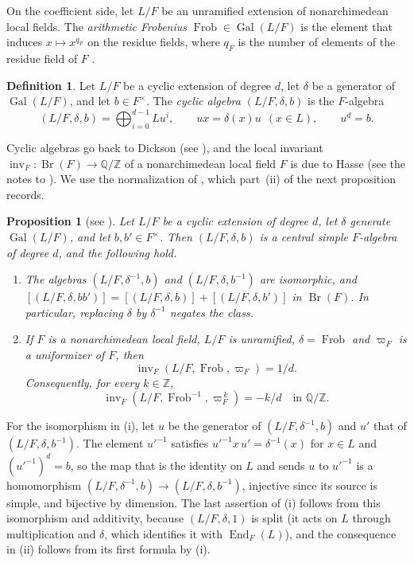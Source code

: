\documentclass[a4paper,11pt]{amsart}
\newtheorem{proposition}[theorem]{Proposition}
\theoremstyle{definition}
\newtheorem{definition}[theorem]{Definition}
\theoremstyle{remark}
\numberwithin{equation}{section}
\newcommand{\Q}{\mathbb{Q}}
\newcommand{\Z}{\mathbb{Z}}
\DeclareMathOperator{\Br}{Br}
\DeclareMathOperator{\inv}{inv}
\DeclareMathOperator{\End}{End}
\DeclareMathOperator{\Gal}{Gal}
\DeclareMathOperator{\Frob}{Frob}
\begin{document}
On the coefficient side, let $L/F$ be an unramified extension of nonarchimedean local fields. The \emph{arithmetic Frobenius} $\Frob\in\Gal(L/F)$ is the element that induces $x\mapsto x^{q_F}$ on the residue fields, where $q_F$ is the number of elements of the residue field of $F$ \cite[I, \S1]{Mil20}.

\begin{definition}\label{def:cyclic}
Let $L/F$ be a cyclic extension of degree $d$, let $\delta$ be a generator of $\Gal(L/F)$, and let $b\in F^\times$. The \emph{cyclic algebra} $(L/F,\delta,b)$ is the $F$-algebra
\[
 (L/F,\delta,b)=\bigoplus_{i=0}^{d-1}Lu^i,\qquad ux=\delta(x)u\ \ (x\in L), \qquad u^d=b.
\]
\end{definition}

Cyclic algebras go back to Dickson (see \cite[VIII, \S2]{Mil20}), and the local invariant $\inv_F\colon\Br(F)\to\Q/\Z$ of a nonarchimedean local field $F$ is due to Hasse (see the notes to \cite[IV, \S4]{Mil20}). We use the normalization of \cite[IV, \S4]{Mil20}, which part~(ii) of the next proposition records.

\begin{proposition}[see {\cite[IV, Theorem~3.14, Lemma~3.15 and Example~4.2]{Mil20}}]
\label{prop:cyclic}
Let $L/F$ be a cyclic extension of degree $d$, let $\delta$ generate $\Gal(L/F)$, and let $b,b'\in F^\times$. Then $(L/F,\delta,b)$ is a central simple $F$-algebra of degree $d$, and the following hold.
\begin{enumerate}
\item[(i)] The algebras $(L/F,\delta^{-1},b)$ and $(L/F,\delta,b^{-1})$ are isomorphic, and $[(L/F,\delta,bb')]=[(L/F,\delta,b)]+[(L/F,\delta,b')]$ in $\Br(F)$. In particular, replacing $\delta$ by $\delta^{-1}$ negates the class.
\item[(ii)] If $F$ is a nonarchimedean local field, $L/F$ is unramified, $\delta=\Frob$ and $\varpi_F$ is a uniformizer of $F$, then
\[
 \inv_F(L/F,\Frob,\varpi_F)=1/d.
\]
Consequently, for every $k\in\Z$,
\[
 \inv_F(L/F,\Frob^{-1},\varpi_F^{\,k})=-k/d\quad\text{in }\Q/\Z.
\]
\end{enumerate}
\end{proposition}

For the isomorphism in (i), let $u$ be the generator of $(L/F,\delta^{-1},b)$ and $u'$ that of $(L/F,\delta,b^{-1})$. The element $u'^{-1}$ satisfies $u'^{-1}x\,u'=\delta^{-1}(x)$ for $x\in L$ and $(u'^{-1})^d=b$, so the map that is the identity on $L$ and sends $u$ to $u'^{-1}$ is a homomorphism $(L/F,\delta^{-1},b)\to(L/F,\delta,b^{-1})$, injective since its source is simple, and bijective by dimension. The last assertion of (i) follows from this isomorphism and additivity, because $(L/F,\delta,1)$ is split (it acts on $L$ through multiplication and $\delta$, which identifies it with $\End_F(L)$), and the consequence in (ii) follows from its first formula by (i).
\end{document}
